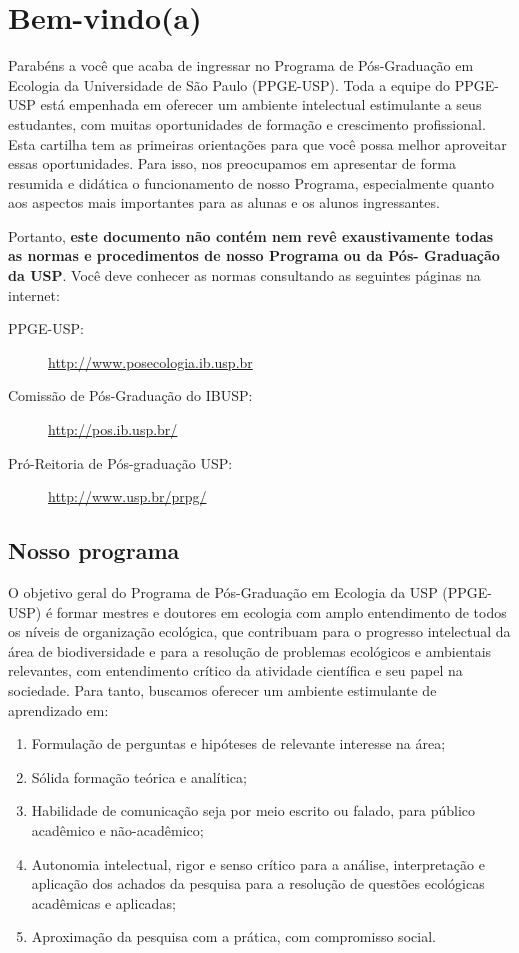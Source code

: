 \chapter{Bem-vindo(a)}
\label{chap:aprest}

Parabéns a você que acaba de ingressar no Programa de Pós-Graduação em
Ecologia da Universidade de São Paulo (PPGE-USP). Toda a equipe do
PPGE-USP está empenhada em oferecer um ambiente intelectual
estimulante a seus estudantes, com muitas oportunidades de formação e
crescimento profissional. Esta cartilha tem as primeiras orientações
para que você possa melhor aproveitar essas oportunidades. Para isso,
nos preocupamos em apresentar de forma resumida e didática o
funcionamento de nosso Programa, especialmente quanto aos aspectos
mais importantes para as alunas e os alunos ingressantes.

Portanto, \textbf{este documento não contém nem revê exaustivamente
todas as normas e procedimentos de nosso Programa ou da Pós- Graduação
da USP}. Você deve conhecer as normas consultando as seguintes páginas
na internet:

\begin{description}
\item[PPGE-USP:] \url{http://www.posecologia.ib.usp.br}
\item[Comissão de Pós-Graduação do IBUSP:] \url{http://pos.ib.usp.br/}
\item[Pró-Reitoria de Pós-graduação USP:] \url{http://www.usp.br/prpg/}
\end{description}


\section{Nosso  programa}

O objetivo geral do Programa de Pós-Graduação em Ecologia da USP
(PPGE-USP) é formar mestres e doutores em ecologia com amplo
entendimento de todos os níveis de organização ecológica, que
contribuam para o progresso intelectual da área de biodiversidade e
para a resolução de problemas ecológicos e ambientais relevantes, com
entendimento crítico da atividade científica e seu papel na sociedade.
Para tanto, buscamos oferecer um ambiente estimulante de aprendizado
em:

\begin{enumerate}
\item Formulação de perguntas e hipóteses de relevante interesse na área;
\item Sólida formação teórica e analítica;
\item Habilidade de comunicação seja por meio escrito ou falado, para
  público acadêmico e não-acadêmico;
\item Autonomia intelectual, rigor e senso crítico para a análise,
  interpretação e aplicação dos achados da pesquisa para a resolução
  de questões ecológicas acadêmicas e aplicadas;
\item Aproximação da pesquisa com a prática, com compromisso social.
\end{enumerate}

